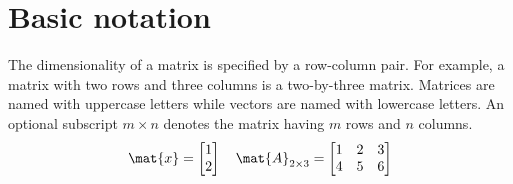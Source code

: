\section{Basic notation}

The dimensionality of a matrix is specified by a row-column pair. For example, a
matrix with two rows and three columns is a two-by-three matrix. Matrices are
named with uppercase letters while vectors are named with lowercase letters. An
optional subscript ${m \times n}$ denotes the matrix having $m$ rows and $n$
columns.
\begin{equation*}
  \mat{x} =
  \begin{bmatrix}
    1 \\
    2
  \end{bmatrix}
  \quad
  \mat{A}_{2 \times 3} =
  \begin{bmatrix}
    1 & 2 & 3 \\
    4 & 5 & 6
  \end{bmatrix}
\end{equation*}
